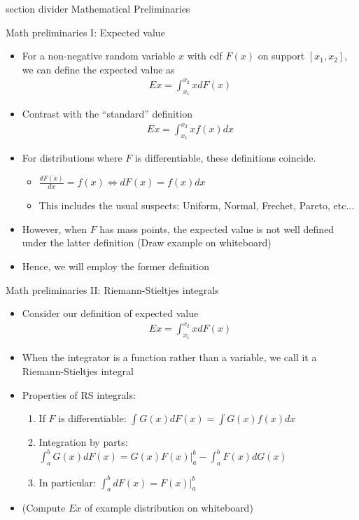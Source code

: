 \documentclass[9pt]{beamer}
\newcommand{\sectiondivider}[1]{
	\begin{frame}[plain]
		\vfill
		\begin{beamercolorbox}[wd=.84\textwidth,sep=1.1em,center,rounded=true]{section divider}
			{\usebeamerfont{section title} #1}
		\end{beamercolorbox}
		\vfill
	\end{frame}
}
\newcommand{\bit}{\begin{itemize}}
\newcommand{\eit}{\end{itemize}}
\newcommand{\ben}{\begin{enumerate}}
\newcommand{\een}{\end{enumerate}}
\newcommand{\bc}{\color{blue}}
\newcommand{\rc}{\color{red}}
\begin{document}
\sectiondivider{Mathematical Preliminaries}

\begin{frame}{Math preliminaries I: Expected value}

\bit
\setlength\itemsep{1.5em}

\item For a non-negative random variable $x$ with cdf $F(x)$ on support $[x_1, x_2]$, we can define the expected value as 
\begin{eqnarray}
Ex = \int_{x_1}^{x_2} x d F(x) \nonumber
\end{eqnarray}

\item Contrast with the ``standard'' definition
\begin{eqnarray}
Ex = \int_{x_1}^{x_2} x f(x)dx \nonumber
\end{eqnarray}

\item For distributions where $F$ is differentiable, these definitions coincide.  
\bit
\setlength\itemsep{0.5em}
\item $\frac{d F(x)}{d x} = f(x) \Leftrightarrow dF(x) = f(x)dx$

\item This includes the usual suspects: Uniform, Normal, Frechet, Pareto, etc... 
\eit

\item However, when $F$ has mass points, the expected value is not well defined under the latter definition {\rc (Draw example on whiteboard)}

\item Hence, we will employ the former definition

\eit
\end{frame}


\begin{frame}{Math preliminaries II: Riemann-Stieltjes integrals}

\bit
\setlength\itemsep{2em}

\item Consider our definition of expected value
\begin{eqnarray}
Ex = \int_{x_1}^{x_2} x d F(x) \nonumber
\end{eqnarray}

\item When the integrator is a function rather than a variable, we call it a {\bc Riemann-Stieltjes integral}

\item Properties of RS integrals:
\ben
\setlength\itemsep{1em}
\item If $F$ is differentiable: $\int G(x) dF(x) = \int G(x) f(x) dx$

\item Integration by parts: $\int_{a}^{b} G(x) dF(x) = G(x)F(x)|_{a}^{b} - \int_{a}^{b} F(x) dG(x)$

\item In particular: $\int_{a}^{b} dF(x) = F(x)|_{a}^{b}$ 
\een

\item {\rc (Compute $Ex$ of example distribution on whiteboard)} 

\eit
\end{frame}
\end{document}
